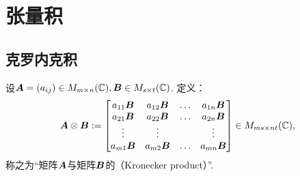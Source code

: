 \section{张量积}
\subsection{克罗内克积}
\begin{definition}
设\(\boldsymbol{A} = (a_{ij}) \in M_{m \times n}(\mathbb{C}),
\boldsymbol{B} \in M_{s \times t}(\mathbb{C})\).
定义：\begin{equation}
	\boldsymbol{A}\otimes\boldsymbol{B}
	:=
	\begin{bmatrix}
		a_{11} \boldsymbol{B} & a_{12} \boldsymbol{B} & \dots & a_{1n} \boldsymbol{B} \\
		a_{21} \boldsymbol{B} & a_{22} \boldsymbol{B} & \dots & a_{2n} \boldsymbol{B} \\
		\vdots & \vdots & & \vdots \\
		a_{m1} \boldsymbol{B} & a_{m2} \boldsymbol{B} & \dots & a_{mn} \boldsymbol{B}
	\end{bmatrix}
	\in M_{ms \times nt}(\mathbb{C}),
\end{equation}
称之为“矩阵\(\boldsymbol{A}\)与矩阵\(\boldsymbol{B}\)的（Kronecker product）”.
\end{definition}

